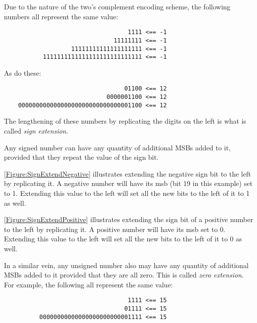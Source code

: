 \label{SignExtension}
Due to the nature of the two's complement encoding scheme, the following 
numbers all represent the same value:
\begin{verbatim}
                                   1111 <== -1
                               11111111 <== -1
                   11111111111111111111 <== -1
           1111111111111111111111111111 <== -1
\end{verbatim}
As do these:
\begin{verbatim}
                                  01100 <== 12
                             0000001100 <== 12
    00000000000000000000000000000001100 <== 12
\end{verbatim}

The lengthening of these numbers by replicating the digits on the left
is what is called {\em sign extension}.  

\begin{tcolorbox}
Any signed number can have any quantity of additional MSBs added to it,
provided that they repeat the value of the sign bit.
\end{tcolorbox}

\autoref{Figure:SignExtendNegative} illustrates extending the negative sign
bit to the left by replicating it.
A negative number will have its \acrshort{msb} (bit 19 in this example)
set to 1.   Extending this value to the left will set all the new bits
to the left of it to 1 as well.

\begin{figure}[ht]
\centering
{}
\label{Figure:SignExtendNegative}
\end{figure}

\autoref{Figure:SignExtendPositive} illustrates extending the sign bit of a
positive number to the left by replicating it.
A positive number will have its \acrshort{msb} set to 0.  Extending this
value to the left will set all the new bits to the left of it to 0 as well.

\begin{figure}[ht]
\centering
{}
\label{Figure:SignExtendPositive}
\end{figure}


\label{ZeroExtension}
In a similar vein, any unsigned number also may have any quantity of 
additional MSBs added to it provided that they are all zero.  This is
called {\em zero extension}.  For example,
the following all represent the same value:
\begin{verbatim}
                                   1111 <== 15
                                  01111 <== 15
          00000000000000000000000001111 <== 15
\end{verbatim}

